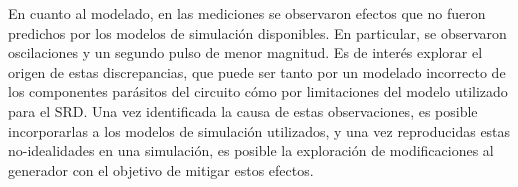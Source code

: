 En cuanto al modelado, en las mediciones se observaron efectos que no fueron
predichos por los modelos de simulación disponibles. En particular, se
observaron oscilaciones y un segundo pulso de menor magnitud. Es de interés
explorar el origen de estas discrepancias, que puede ser tanto por un modelado
incorrecto de los componentes parásitos del circuito cómo por limitaciones del
modelo utilizado para el SRD. Una vez identificada la causa de estas
observaciones, es posible incorporarlas a los modelos de simulación utilizados,
y una vez reproducidas estas no-idealidades en una simulación, es posible la
exploración de modificaciones al generador con el objetivo de mitigar estos
efectos.
